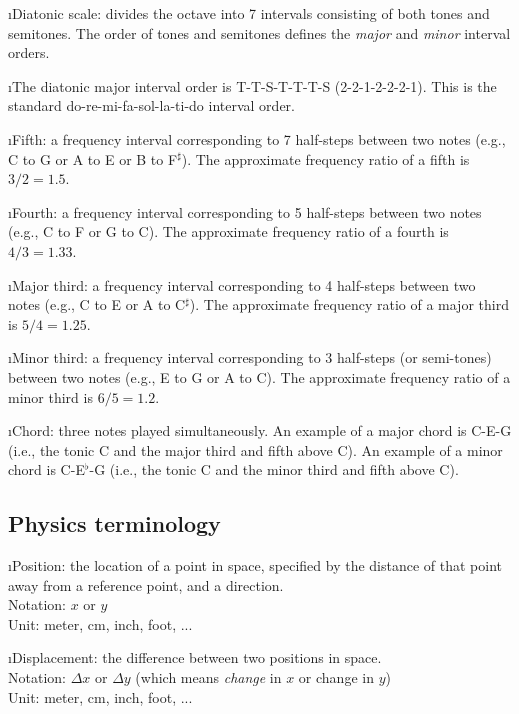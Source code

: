 \i Diatonic scale: divides the octave into 
7 intervals consisting of both tones and semitones.
The order of tones and semitones 
defines the {\em major} and 
{\em minor} interval orders.

\i The diatonic major interval order is 
T-T-S-T-T-T-S (2-2-1-2-2-2-1).
This is the standard
%
\be
{\rm do-re-mi-fa-sol-la-ti-do}
\nonumber
\ee
%
interval order.

\i Fifth: a frequency interval corresponding to 
7 half-steps between two notes 
(e.g., C to G or A to E or B to F$^\sharp$).
The approximate frequency ratio of a fifth is $3/2=1.5$. 

\i Fourth: a frequency interval corresponding to
5 half-steps between two notes
(e.g., C to F or G to C).
The approximate frequency ratio of a fourth is $4/3=1.33$.

\i Major third: a frequency interval corresponding to 
4 half-steps between two notes 
(e.g., C to E or A to C$^\sharp$).
The approximate frequency ratio of a major third is $5/4=1.25$. 

\i Minor third: a frequency interval corresponding to 
3 half-steps (or semi-tones) between two notes 
(e.g., E to G or A to C).
The approximate frequency ratio of a minor third is $6/5=1.2$. 

\i Chord: three notes played simultaneously.
An example of a major chord is C-E-G (i.e., the tonic C
and the major third and fifth above C).
An example of a minor chord is C-E$^\flat$-G (i.e., the tonic C
and the minor third and fifth above C).

\ei

\subsection{Physics terminology}

\bi

\i Position: 
the location of a point in space,
specified by the distance of that point away from a 
reference point, and a direction.
\\
Notation: $x$ or $y$
\\
Unit: meter, cm, inch, foot, ...

\i Displacement: 
the difference between two positions in space.
\\
Notation: $\Delta x$ or $\Delta y$ 
(which means {\em change} in $x$ or change in $y$)
\\
Unit: meter, cm, inch, foot, ...

